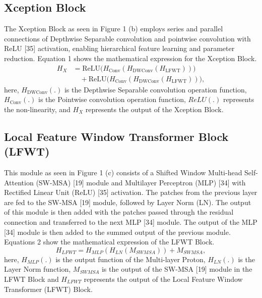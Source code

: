 \documentclass[journal]{IEEEtran}
\begin{document}
\subsection{Xception Block}
The Xception Block as seen in Figure 1 (b) employs series and parallel connections of Depthwise Separable convolution and pointwise convolution with ReLU [35] activation, enabling hierarchical feature learning and parameter reduction. Equation 1 shows the mathematical expression for the Xception Block. 
\begin{equation}
\begin{aligned}
    {H_{X}} &= \text{ReLU}\bigl(H_{\text{Conv}}(H_{\text{DWConv}}(H_{\text{LFWT}}))\bigr) \\ 
    &\quad+ \text{ReLU}\bigl(H_{\text{Conv}}(H_{\text{DWConv}}(H_{\text{LFWT}}))\bigr), 
\end{aligned}
\end{equation}
here, $H_{\text{DWConv}}$$(.)$ is the Depthwise Separable convolution operation function, ${H_{\text{Conv}}}$$(.)$  is the Pointwise convolution operation function, ${ReLU}$$(.)$ represents the non-linearity, and ${H_{X}}$ represents the output of the Xception Block.

\subsection{Local Feature Window Transformer Block (LFWT)}
This module as seen in Figure 1 (c) consists of a Shifted Window Multi-head Self-Attention (SW-MSA) [19] module and Multilayer Perceptron (MLP) [34] with Rectified Linear Unit (ReLU) [35] activation. The patches from the previous layer are fed to the SW-MSA [19] module, followed by Layer Norm (LN). The output of this module is then added with the patches passed through the residual connection and transferred to the next MLP [34] module. The output of the MLP [34] module is then added to the summed output of the previous module. Equations 2 show the mathematical expression of the LFWT Block.
\begin{equation}
{H_{LFWT}}= {H_{MLP}}({H_{LN}}({M_{SWMSA}})) + {M_{SWMSA}}, 
\end{equation}
here, ${H_{MLP}}$$(.)$ is the output function of the Multi-layer Proton, ${H_{LN}}$$(.)$ is the Layer Norm function, ${M_{SWMSA}}$  is the output of the SW-MSA [19] module in the LFWT Block and ${H_{LFWT}}$ represents the output of the Local Feature Window Transformer (LFWT) Block. 
\end{document}
